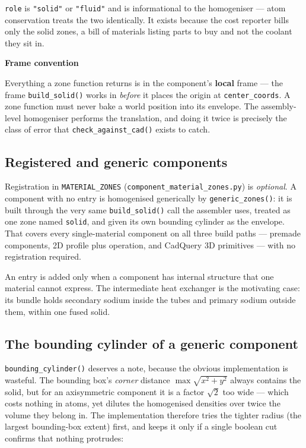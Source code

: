 \documentclass[9pt,a4paper]{extarticle}
\newcommand{\code}[1]{\texttt{\small #1}}
\newcommand{\file}[1]{\texttt{\small #1}}
\newenvironment{caveat}[1]%
  {\par\medskip\noindent
   \begin{lrbox}{\caveatbox}%
   \begin{minipage}{\dimexpr\linewidth-2\fboxsep-2\fboxrule\relax}%
   \textbf{#1}\par\medskip}%
  {\end{minipage}%
   \end{lrbox}%
   \fcolorbox{warnrule}{warnbg}{\usebox{\caveatbox}}\par\medskip}
\begin{document}
\noindent
\code{role} is \code{"solid"} or \code{"fluid"} and is informational to the
homogeniser --- atom conservation treats the two identically. It exists because
the cost reporter bills only the solid zones, a bill of materials listing parts
to buy and not the coolant they sit in.

\begin{caveat}{Frame convention}
Everything a zone function returns is in the component's \textbf{local} frame
--- the frame \code{build\_solid()} works in \emph{before} it places the origin
at \code{center\_coords}. A zone function must never bake a world position into
its envelope. The assembly-level homogeniser performs the translation, and
doing it twice is precisely the class of error that
\code{check\_against\_cad()} exists to catch.
\end{caveat}

\subsection{Registered and generic components}

Registration in \code{MATERIAL\_ZONES} (\file{component\_material\_zones.py}) is
\emph{optional}. A component with no entry is homogenised generically by
\code{generic\_zones()}: it is built through the very same \code{build\_solid()}
call the assembler uses, treated as one zone named \code{solid}, and given its
own bounding cylinder as the envelope. That covers every single-material
component on all three build paths --- premade components, 2D profile plus
operation, and CadQuery 3D primitives --- with no registration required.

An entry is added only when a component has internal structure that one material
cannot express. The intermediate heat exchanger is the motivating case: its
bundle holds secondary sodium inside the tubes and primary sodium outside them,
within one fused solid.

\subsection{The bounding cylinder of a generic component}

\code{bounding\_cylinder()} deserves a note, because the obvious implementation
is wasteful. The bounding box's \emph{corner} distance
$\max\sqrt{x^2+y^2}$ always contains the solid, but for an axisymmetric
component it is a factor $\sqrt{2}$ too wide --- which costs nothing in atoms,
yet dilutes the homogenised densities over twice the volume they belong in. The
implementation therefore tries the tighter radius (the largest bounding-box
extent) first, and keeps it only if a single boolean cut confirms that nothing
protrudes:
\end{document}

